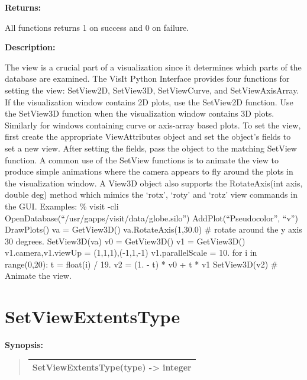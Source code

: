\documentclass[letterpaper,10pt,english]{sphinxmanual}
\begin{document}
\begin{DUlineblock}{0em}
\item[] 
\item[] \textbf{Returns:}
\item[] All functions returns 1 on success and 0 on failure.
\item[] 
\item[] \textbf{Description:}
\item[] The view is a crucial part of a visualization since it determines
which parts of the database are examined. The VisIt Python Interface
provides four functions for setting the view: SetView2D, SetView3D,
SetViewCurve, and SetViewAxisArray. If the visualization window
contains 2D plots, use the SetView2D function. Use the SetView3D
function when the visualization window contains 3D plots.  Similarly
for windows containing curve or axis-array based plots.  To set the
view, first create the appropriate ViewAttributes object and set the
object's fields to set a new view. After setting the fields, pass the
object to the matching SetView function. A common use of the SetView
functions is to animate the view to produce simple animations where
the camera appears to fly around the plots in the visualization
window.
A View3D object also supports the RotateAxis(int axis, double deg)
method which mimics the `rotx', `roty' and `rotz' view commands in
the GUI.
Examples:
\% visit -cli
OpenDatabase(``/usr/gapps/visit/data/globe.silo'')
AddPlot(``Pseudocolor'', ``v'')
DrawPlots()
va = GetView3D()
va.RotateAxis(1,30.0) \# rotate around the y axis 30 degrees.
SetView3D(va)
v0 = GetView3D()
v1 = GetView3D()
v1.camera,v1.viewUp = (1,1,1),(-1,1,-1)
v1.parallelScale = 10.
for i in range(0,20):
t = float(i) / 19.
v2 = (1. - t) * v0 + t * v1
SetView3D(v2) \# Animate the view.
\end{DUlineblock}

\begin{DUlineblock}{0em}
\item[] 
\end{DUlineblock}


\section{SetViewExtentsType}
\label{functions:setviewextentstype}
\begin{DUlineblock}{0em}
\item[] \textbf{Synopsis:}
\end{DUlineblock}
\begin{quote}

\begin{tabulary}{\linewidth}{|L|}
\hline

SetViewExtentsType(type) -\textgreater{} integer
\\
\hline\end{tabulary}

\end{quote}
\end{document}
